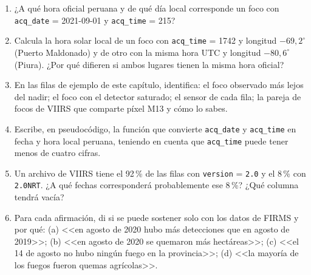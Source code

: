 \begin{enumerate}
  \item ¿A qué hora oficial peruana y de qué día local corresponde un foco con
  \texttt{acq\_date} = 2021-09-01 y \texttt{acq\_time} = 215?
  \item Calcula la hora solar local de un foco con \texttt{acq\_time} = 1742 y longitud
  $-69{,}2^\circ$ (Puerto Maldonado) y de otro con la misma hora UTC y longitud $-80{,}6^\circ$
  (Piura). ¿Por qué difieren si ambos lugares tienen la misma hora oficial?
  \item En las filas de ejemplo de este capítulo, identifica: el foco observado más lejos del
  nadir; el foco con el detector saturado; el sensor de cada fila; la pareja de focos de VIIRS
  que comparte píxel M13 y cómo lo sabes.
  \item Escribe, en pseudocódigo, la función que convierte \texttt{acq\_date} y
  \texttt{acq\_time} en fecha y hora local peruana, teniendo en cuenta que \texttt{acq\_time}
  puede tener menos de cuatro cifras.
  \item Un archivo de VIIRS tiene el 92\,{}\% de las filas con \texttt{version} = \texttt{2.0} y
  el 8\,{}\% con \texttt{2.0NRT}. ¿A qué fechas corresponderá probablemente ese 8\,{}\%? ¿Qué
  columna tendrá vacía?
  \item Para cada afirmación, di si se puede sostener solo con los datos de FIRMS y por qué:
  (a) <<en agosto de 2020 hubo más detecciones que en agosto de 2019>>; (b) <<en agosto de 2020
  se quemaron más hectáreas>>; (c) <<el 14 de agosto no hubo ningún fuego en la provincia>>;
  (d) <<la mayoría de los fuegos fueron quemas agrícolas>>.
\end{enumerate}

